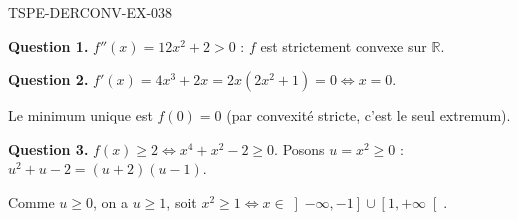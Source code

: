 \begin{corrige}{TSPE-DERCONV-EX-038}

\textbf{Question 1.} $f''(x) = 12x^2 + 2 > 0$ : $f$ est strictement convexe sur $\mathbb{R}$.


\textbf{Question 2.} $f'(x) = 4x^3 + 2x = 2x(2x^2+1) = 0 \iff x = 0$.

Le minimum unique est $f(0) = 0$ (par convexité stricte, c'est le seul extremum).

\textbf{Question 3.} $f(x) \geq 2 \iff x^4 + x^2 - 2 \geq 0$. Posons $u = x^2 \geq 0$ : $u^2 + u - 2 = (u+2)(u-1)$.

Comme $u \geq 0$, on a $u \geq 1$, soit $x^2 \geq 1 \iff x \in \left]-\infty, -1\right] \cup \left[1, +\infty\right[$.

\end{corrige}
